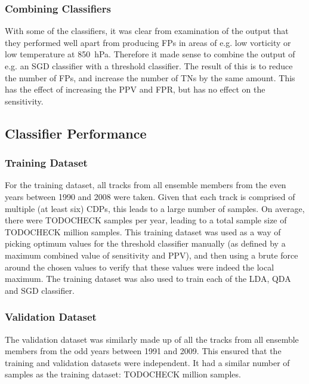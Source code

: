 \documentclass[pdftex,12pt,a4paper]{report}
\begin{document}
\subsubsection{Combining Classifiers}
With some of the classifiers, it was clear from examination of the output that they performed well
apart from producing FPs in areas of e.g. low vorticity or low temperature at \SI{850}{hPa}.
Therefore it made sense to combine the output of e.g. an SGD classifier with a threshold classifier.
The result of this is to reduce the number of FPs, and increase the number of TNs by the same
amount. This has the effect of increasing the PPV and FPR, but has no effect on the sensitivity.

\subsection{Classifier Performance}



\subsubsection{Training Dataset}
For the training dataset, all tracks from all ensemble members from the even years between 1990 and
2008 were taken. Given that each track is comprised of multiple (at least six) CDPs, this leads to a
large number of samples. On average, there were TODOCHECK samples per year, leading to a total
sample size of TODOCHECK million samples. This training dataset was used as a way of picking optimum
values for the threshold classifier manually (as defined by a maximum combined value of sensitivity
and PPV), and then using a brute force around the chosen values to verify that these values were
indeed the local maximum. The training dataset was also used to train each of the LDA, QDA and SGD
classifier.

\subsubsection{Validation Dataset} The validation dataset was similarly made up of all the tracks
from all ensemble members from the odd years between 1991 and 2009. This ensured that the training
and validation datasets were independent. It had a similar number of samples as the training
dataset: TODOCHECK million samples.
\end{document}
